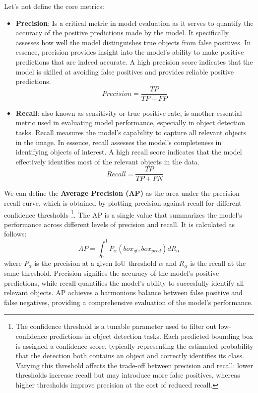 Let's not define the core metrics: 
\begin{itemize}
    \item \textbf{Precision}: Is a critical metric in model evaluation as it serves to quantify the accuracy of the positive predictions made by the model. It specifically assesses how well the model distinguishes true objects from false positives. In essence, precision provides insight into the model’s ability to make positive predictions that are indeed accurate. A high precision score indicates that the model is skilled at avoiding false positives and provides reliable positive predictions.
    \begin{equation}
        Precision = \frac{TP}{TP + FP}
    \end{equation}

    \item \textbf{Recall}: also known as sensitivity or true positive rate, is another essential metric used in evaluating model performance, especially in object detection tasks. Recall measures the model’s capability to capture all relevant objects in the image. In essence, recall assesses the model’s completeness in identifying objects of interest. A high recall score indicates that the model effectively identifies most of the relevant objects in the data.
    \begin{equation}
        Recall = \frac{TP}{TP + FN}
    \end{equation}
\end{itemize}
We can define the \textbf{Average Precision (AP)} as the area under the precision-recall curve, which is obtained by plotting precision against recall for different confidence thresholds \footnote{The confidence threshold is a tunable parameter used to filter out low-confidence predictions in object detection tasks. Each predicted bounding box is assigned a confidence score, typically representing the estimated probability that the detection both contains an object and correctly identifies its class. Varying this threshold affects the trade-off between precision and recall: lower thresholds increase recall but may introduce more false positives, whereas higher thresholds improve precision at the cost of reduced recall.}. The AP is a single value that summarizes the model's performance across different levels of precision and recall. It is calculated as follows:
\begin{equation}
    AP = \int_{0}^{1} P_{\alpha}(box_{gt}, box_{pred}) dR_{\alpha}
\end{equation}
where \( P_{\alpha} \) is the precision at a given IoU threshold \( \alpha \) and \( R_{\alpha} \) is the recall at the same threshold.
Precision signifies the accuracy of the model's positive predictions, while recall quantifies the model's ability to succesfully identify all relevant objects. AP achieves a harmonious balance between false positive and false negatives, providing a comprehensive evaluation of the model's performance. 

